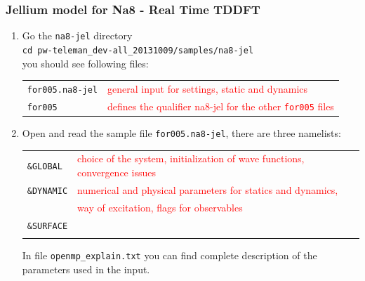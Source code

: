 \documentclass[10pt]{beamer}
\begin{document}
\begin{frame}
\frametitle{Jellium model for Na8 - Real Time TDDFT}
\begin{enumerate}
\item Go the {\tt na8-jel} directory\\
{\tt cd pw-teleman\_dev-all\_20131009/samples/na8-jel}\\
you should see following files:\\
\begin{tabular}{ll}
{\tt for005.na8-jel} &{\scriptsize{\textcolor{red}{general input for settings, static and dynamics}}}\\
{\tt for005}  &{\scriptsize{\textcolor{red}{defines the qualifier na8-jel for the other {\tt for005} files}}}\\
\end{tabular}
\item Open and read the sample file {\tt for005.na8-jel}, there are three namelists:\\
\begin{tabular}{ll}
 {\tt \&GLOBAL} & {\scriptsize{\textcolor{red}{choice of the system, initialization of wave functions, convergence issues}}}\\
{\tt \&DYNAMIC}&{\scriptsize{\textcolor{red}{numerical and physical parameters for statics and dynamics, }}}\\
&{\scriptsize{\textcolor{red}{way of excitation, flags for observables}}}\\
 {\tt \&SURFACE}&\\
 \vspace*{0.2cm}
\end{tabular}
In file {\tt openmp\_explain.txt} you can find complete description of the parameters used in the input. 
\end{enumerate}
\end{frame}
\end{document}

